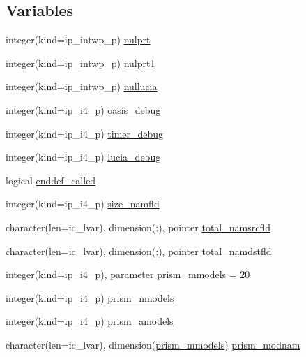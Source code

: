 \subsection*{Variables}
\begin{DoxyCompactItemize}
\item 
integer(kind=ip\+\_\+intwp\+\_\+p) \hyperlink{namespacemod__oasis__data_af0f17b70f48598dac24f2e41ca0da4b2}{nulprt}
\item 
integer(kind=ip\+\_\+intwp\+\_\+p) \hyperlink{namespacemod__oasis__data_a2b9f5c72f10178df0bda39000b151d24}{nulprt1}
\item 
integer(kind=ip\+\_\+intwp\+\_\+p) \hyperlink{namespacemod__oasis__data_a46d81d5ac9efa619628264c5e45bac41}{nullucia}
\item 
integer(kind=ip\+\_\+i4\+\_\+p) \hyperlink{namespacemod__oasis__data_a51f2f4f66476cf893f2507722cd65958}{oasis\+\_\+debug}
\item 
integer(kind=ip\+\_\+i4\+\_\+p) \hyperlink{namespacemod__oasis__data_a320a34357de5c3049ccf102df7b97f5e}{timer\+\_\+debug}
\item 
integer(kind=ip\+\_\+i4\+\_\+p) \hyperlink{namespacemod__oasis__data_a7c427f27ff231565a1ecc0caeb30c67c}{lucia\+\_\+debug}
\item 
logical \hyperlink{namespacemod__oasis__data_a5341a9152ef540667f7fcaa4f04c6399}{enddef\+\_\+called}
\item 
integer(kind=ip\+\_\+i4\+\_\+p) \hyperlink{namespacemod__oasis__data_aa8588b3be582de7f61aa318d45854483}{size\+\_\+namfld}
\item 
character(len=ic\+\_\+lvar), dimension(\+:), pointer \hyperlink{namespacemod__oasis__data_a58b5a440f274f5dfb942d7e18f12674c}{total\+\_\+namsrcfld}
\item 
character(len=ic\+\_\+lvar), dimension(\+:), pointer \hyperlink{namespacemod__oasis__data_a81466361b20004007f221dd6a32041f9}{total\+\_\+namdstfld}
\item 
integer(kind=ip\+\_\+i4\+\_\+p), parameter \hyperlink{namespacemod__oasis__data_a11c61975c048981f7e508f1b6caf16b6}{prism\+\_\+mmodels} = 20
\item 
integer(kind=ip\+\_\+i4\+\_\+p) \hyperlink{namespacemod__oasis__data_a5915b02f461626d5a6cffbf037daa75e}{prism\+\_\+nmodels}
\item 
integer(kind=ip\+\_\+i4\+\_\+p) \hyperlink{namespacemod__oasis__data_ac73f95bc17215d09b67c6c4d3adc07b7}{prism\+\_\+amodels}
\item 
character(len=ic\+\_\+lvar), dimension(\hyperlink{namespacemod__oasis__data_a11c61975c048981f7e508f1b6caf16b6}{prism\+\_\+mmodels}) \hyperlink{namespacemod__oasis__data_abd4b98e9f321bc073d5a8e0292ba7131}{prism\+\_\+modnam}

\end{DoxyCompactItemize}
